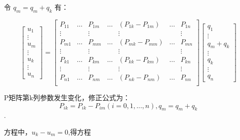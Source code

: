 \documentclass[11pt]{article}
\begin{document}
令 \(q_{m}=q_{m}+q_{k}\) 有：

\begin{equation} 
 \begin{bmatrix}
  u_1\\
  \vdots\\
  u_m\\
  \vdots\\
  u_k\\
  \vdots\\
  u_n
  \end{bmatrix} =
  \begin{bmatrix}
  P_{11}&\dots& P_{1m}&\dots&(P_{1k}-P_{1m})&\dots&P_{1n}\\
  \vdots& &\vdots& &\vdots& &\vdots\\
  P_{m1}&\dots& P_{mm}&\dots&(P_{mk}-P_{mm})&\dots&P_{mn}\\
  \vdots& &\vdots& &\vdots& &\vdots\\
   P_{k1}&\dots& P_{km}&\dots&(P_{kk}-P_{km})&\dots&P_{kn}\\
  \vdots& &\vdots& &\vdots& &\vdots\\ 
   P_{n1}&\dots& P_{nm}&\dots&(P_{nk}-P_{nm})&\dots&P_{nn}\\
  \end{bmatrix}
  \begin{bmatrix}
   q_1\\
   \vdots\\
  q_m+q_k\\
  \vdots\\
  q_k\\
  \vdots\\
  q_n
 \end{bmatrix}
\end{equation}

P矩阵第k列参数发生变化，修正公式为：\[P_{ik}=P_{ik}-P_{im} ( i=0,1,...,n), q_m=q_m+q_k\].

方程中，\(u_{k}-u_{m}=0\),得方程
\end{document}
